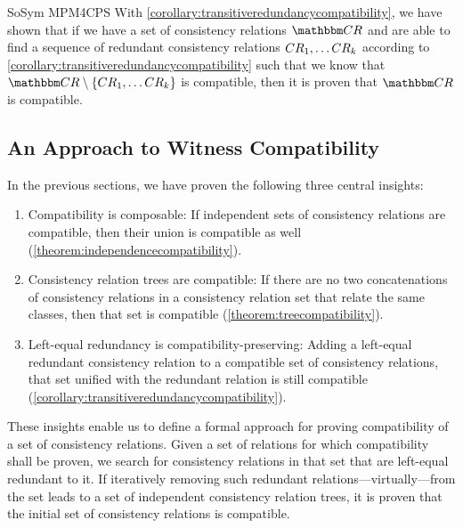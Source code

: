 \begin{copiedFrom}{SoSym MPM4CPS}
With \autoref{corollary:transitiveredundancycompatibility}, we have shown that if we have a set of consistency relations $\consistencyrelationset{CR}$ and are able to find a sequence of redundant consistency relations $CR_{1}, \dots {CR_{k}}$ according to \autoref{corollary:transitiveredundancycompatibility} such that we know that $\consistencyrelationset{CR} \setminus \setted{ \consistencyrelation{CR}{1}, \dots {\consistencyrelation{CR}{k}}}$ is compatible, then it is proven that $\consistencyrelationset{CR}$ is compatible.



\subsection{An Approach to Witness Compatibility} %
\label{sec:formalapproach:summary}

In the previous sections, we have proven the following three central insights:
\begin{enumerate}
    \item Compatibility is composable: If independent sets of consistency relations are compatible, then their union is compatible as well (\autoref{theorem:independencecompatibility}).
    \item Consistency relation trees are compatible: If there are no two concatenations of consistency relations in a consistency relation set that relate the same classes, then that set is compatible (\autoref{theorem:treecompatibility}).
    \item Left-equal redundancy is compatibility-preserving: Adding a left-equal redundant consistency relation to a compatible set of consistency relations, that set unified with the redundant relation is still compatible (\autoref{corollary:transitiveredundancycompatibility}).
\end{enumerate}

These insights enable us to define a formal approach for proving compatibility of a set of consistency relations.
Given a set of relations for which compatibility shall be proven, we search for consistency relations in that set that are left-equal redundant to it.
If iteratively removing such redundant relations---virtually---from the set leads to a set of independent consistency relation trees, it is proven that the initial set of consistency relations is compatible.


\end{copiedFrom}
